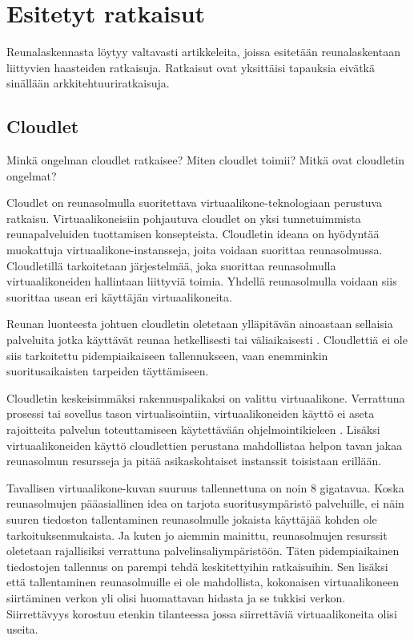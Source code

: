 \documentclass[finnish]{tktltiki2}
\theoremstyle{definition}
\theoremstyle{remark}
\begin{document}
\section{Esitetyt ratkaisut}
Reunalaskennasta löytyy valtavasti artikkeleita, joissa esitetään reunalaskentaan liittyvien haasteiden ratkaisuja. Ratkaisut ovat yksittäisi tapauksia eivätkä sinällään arkkitehtuuriratkaisuja. 
\subsection{Cloudlet}
Minkä ongelman cloudlet ratkaisee?
Miten cloudlet toimii?
Mitkä ovat cloudletin ongelmat?

Cloudlet on reunasolmulla suoritettava virtuaalikone-teknologiaan perustuva ratkaisu. \cite{satya09}
Virtuaalikoneisiin pohjautuva cloudlet on yksi tunnetuimmista reunapalveluiden tuottamisen konsepteista.
Cloudletin ideana on hyödyntää muokattuja virtuaalikone-instansseja, joita voidaan suorittaa reunasolmussa. 
Cloudletillä tarkoitetaan järjestelmää, joka suorittaa reunasolmulla virtuaalikoneiden hallintaan liittyviä toimia.
Yhdellä reunasolmulla voidaan siis suorittaa usean eri käyttäjän virtuaalikoneita. 

Reunan luonteesta johtuen cloudletin oletetaan ylläpitävän ainoastaan sellaisia palveluita jotka käyttävät reunaa hetkellisesti tai väliaikaisesti \cite{satya09}. Cloudlettiä ei ole siis tarkoitettu pidempiaikaiseen tallennukseen, vaan enemminkin suoritusaikaisten tarpeiden täyttämiseen. 

Cloudletin keskeisimmäksi rakennuspalikaksi on valittu virtuaalikone. Verrattuna prosessi tai sovellus tason virtualisointiin, virtuaalikoneiden käyttö ei aseta rajoitteita palvelun toteuttamiseen käytettävään ohjelmointikieleen \cite{satya09}.
Lisäksi virtuaalikoneiden käyttö cloudlettien perustana mahdollistaa helpon tavan jakaa reunasolmun resursseja ja pitää asikaskohtaiset instanssit toisistaan erillään. 

Tavallisen virtuaalikone-kuvan suuruus tallennettuna on noin 8 gigatavua.
Koska reunasolmujen pääasiallinen idea on tarjota suoritusympäristö palveluille,
ei näin suuren tiedoston tallentaminen reunasolmulle jokaista käyttäjää kohden ole tarkoituksenmukaista.
Ja kuten jo aiemmin mainittu, reunasolmujen resurssit oletetaan rajallisiksi verrattuna palvelinsaliympäristöön.
Täten pidempiaikainen tiedostojen tallennus on parempi tehdä keskitettyihin ratkaisuihin.
Sen lisäksi että tallentaminen reunasolmuille ei ole mahdollista, kokonaisen virtuaalikoneen siirtäminen verkon yli olisi huomattavan hidasta ja se tukkisi verkon.
Siirrettävyys korostuu etenkin tilanteessa jossa siirrettäviä virtuaalikoneita olisi useita.
\end{document}
